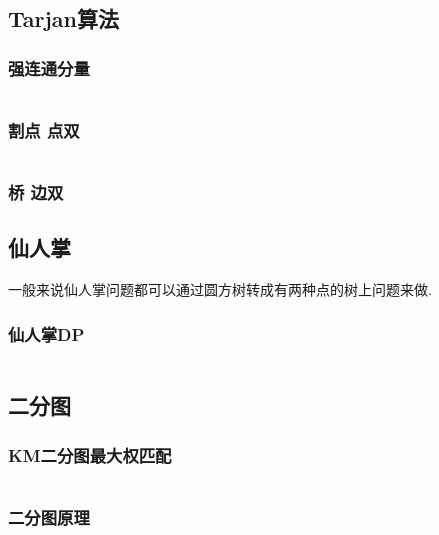 \documentclass[a4paper]{article}
\begin{document}
\begin{multicols}{2}
			\subsection{Tarjan算法}
				\subsubsection{强连通分量}
					\inputminted{cpp}{../src/graph/强连通分量.cpp}
				
				\subsubsection{割点 点双}
					\inputminted{cpp}{../src/graph/割点点双.cpp}

				\subsubsection{桥 边双}


			\subsection{仙人掌}
				一般来说仙人掌问题都可以通过圆方树转成有两种点的树上问题来做.
				\subsubsection{仙人掌DP}
					\inputminted{cpp}{../src/graph/仙人掌DP.cpp}
			
			\subsection{二分图}




				\subsubsection{KM二分图最大权匹配}
					\inputminted{cpp}{../src/graph/KM二分图最大权匹配.cpp}

				\subsubsection{二分图原理}
					
			

\end{multicols}
\end{document}
